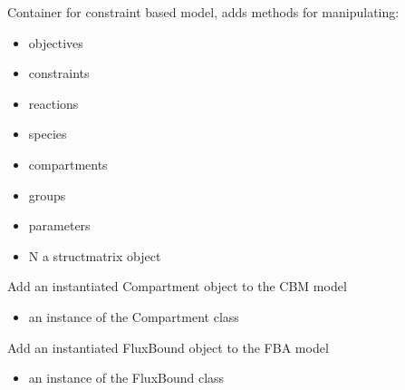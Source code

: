 \documentclass[letterpaper,10pt,english]{sphinxmanual}
\begin{document}
\begin{fulllineitems}
\label{\detokenize{modules_doc:cbmpy.CBModel.Model}}
\pysigstartsignatures
{}
\pysigstopsignatures
\sphinxAtStartPar
Container for constraint based model, adds methods for manipulating:
\begin{itemize}
\item {} 
\sphinxAtStartPar
objectives

\item {} 
\sphinxAtStartPar
constraints

\item {} 
\sphinxAtStartPar
reactions

\item {} 
\sphinxAtStartPar
species

\item {} 
\sphinxAtStartPar
compartments

\item {} 
\sphinxAtStartPar
groups

\item {} 
\sphinxAtStartPar
parameters

\item {} 
\sphinxAtStartPar
N a structmatrix object

\end{itemize}

\begin{fulllineitems}
\label{\detokenize{modules_doc:cbmpy.CBModel.Model.addCompartment}}
\pysigstartsignatures
{}
\pysigstopsignatures
\sphinxAtStartPar
Add an instantiated Compartment object to the CBM model
\begin{itemize}
\item {} 
\sphinxAtStartPar
{} an instance of the Compartment class

\end{itemize}

\end{fulllineitems}


\begin{fulllineitems}
\label{\detokenize{modules_doc:cbmpy.CBModel.Model.addFluxBound}}
\pysigstartsignatures
{}
\pysigstopsignatures
\sphinxAtStartPar
Add an instantiated FluxBound object to the FBA model
\begin{itemize}
\item {} 
\sphinxAtStartPar
{} an instance of the FluxBound class


\end{itemize}
\end{fulllineitems}
\end{fulllineitems}
\end{document}
